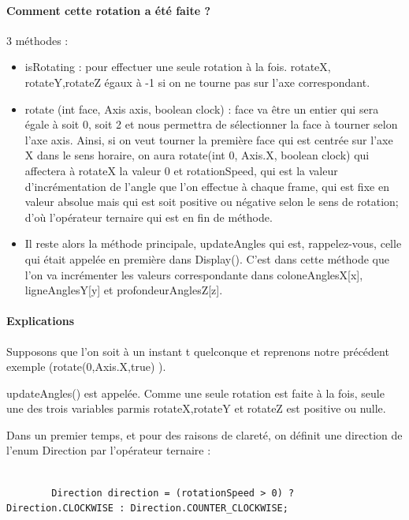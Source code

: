 \paragraph{Comment cette rotation a été faite ?}
3 méthodes :
\begin{itemize}
    \item isRotating : pour effectuer une seule rotation à la fois. rotateX, rotateY,rotateZ égaux à -1 si on ne tourne pas sur l’axe correspondant.
    \item rotate (int face, Axis axis, boolean clock) :
face va être un entier qui sera égale à soit 0, soit 2 et nous permettra de sélectionner la face à tourner selon l’axe axis. Ainsi, si on veut tourner la première face qui est centrée sur l’axe X dans le sens horaire, on aura rotate(int 0, Axis.X, boolean clock) qui affectera à rotateX la valeur 0 et rotationSpeed, qui est la valeur d’incrémentation de l’angle que l’on effectue à chaque frame, qui est fixe en valeur absolue mais qui est soit positive ou négative selon le sens de rotation; d’où l’opérateur ternaire qui est en fin de méthode.
    \item Il reste alors la méthode principale, updateAngles qui est, rappelez-vous, celle qui était appelée en première dans Display(). C'est dans cette méthode que l'on va incrémenter les valeurs correspondante dans 
coloneAnglesX[x], ligneAnglesY[y] et profondeurAnglesZ[z].
\end{itemize}

\paragraph{Explications}
Supposons que l’on soit à un instant t quelconque et reprenons notre précédent exemple (rotate(0,Axis.X,true) ).

updateAngles() est appelée. Comme une seule rotation est faite à la fois, seule une des trois variables parmis rotateX,rotateY et rotateZ est positive ou nulle.

Dans un premier temps, et pour des raisons de clareté, on définit une direction de l’enum Direction par l’opérateur ternaire :

\begin{lstlisting}[frame=single]  % Start your code-block

        Direction direction = (rotationSpeed > 0) ? Direction.CLOCKWISE : Direction.COUNTER_CLOCKWISE;

\end{lstlisting}

